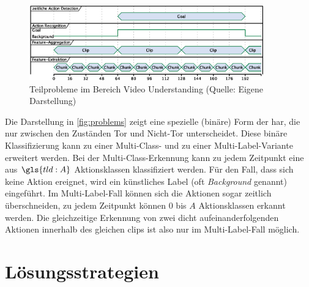 \begin{figure}[htbp]
    \centering
    \includegraphics[width=0.9\textwidth, height=0.9\textwidth, keepaspectratio, interpolate]{fig/problems.eps}
    \caption[Teilprobleme im Bereich Video Understanding]{Teilprobleme im Bereich Video Understanding (Quelle: Eigene Darstellung)}
    \label{fig:problems}
\end{figure}

Die Darstellung in \autoref{fig:problems} zeigt eine spezielle (binäre) Form der \gls{har}, die nur zwischen den Zuständen Tor und Nicht-Tor unterscheidet.
Diese binäre Klassifizierung kann zu einer Multi-Class- und zu einer Multi-Label-Variante erweitert werden.
Bei der Multi-Class-Erkennung kann zu jedem Zeitpunkt eine aus $\gls{tld:A}$ Aktionsklassen klassifiziert werden.
Für den Fall, dass sich keine Aktion ereignet, wird ein künstliches Label (oft \emph{Background} genannt) eingeführt.
Im Multi-Label-Fall können sich die Aktionen sogar zeitlich überschneiden, \dh zu jedem Zeitpunkt können $0$ bis $A$ Aktionsklassen erkannt werden.
Die gleichzeitige Erkennung von zwei dicht aufeinanderfolgenden Aktionen innerhalb des gleichen \glspl{clip} ist also nur im Multi-Label-Fall möglich.


\section{Lösungsstrategien}
\label{sec:loesungsstrategien}

